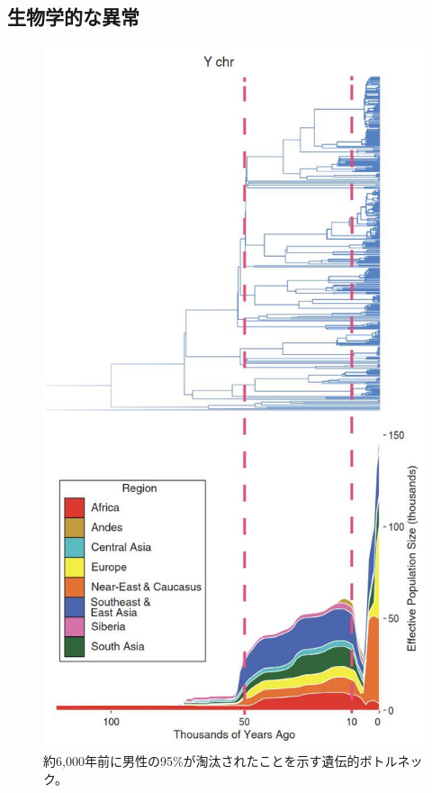 \documentclass[10pt,twocolumn,letterpaper]{article}
\begin{document}
\subsection{生物学的な異常}

\begin{figure}[t]
\begin{center}
   \includegraphics[width=1\linewidth]{bottleneck.jpg}
\end{center}
   \caption{約6,000年前に男性の95\%が淘汰されたことを示す遺伝的ボトルネック\cite{62}。}
\label{fig:10}
\label{fig:onecol}
\end{figure}
\end{document}
